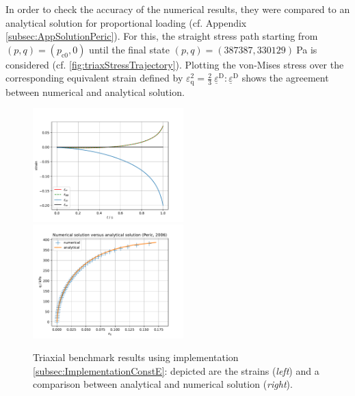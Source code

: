 \documentclass[paper=a4, twoside, pagesize]{scrartcl}
\newcommand{\tensor}[1]{\underline{#1}}
\newcommand{\ppkt}{\colon}
\newcommand{\D}{\text{D}}
\renewcommand{\c}{\text{c}}
\begin{document}
\par
In order to check the accuracy of the numerical results, they were compared to an analytical solution \cite{Peric2006} for proportional loading (cf. Appendix \ref{subsec:AppSolutionPeric}). For this, the straight stress path starting from $(p, q) = (p_{\c0}, 0)$ until the final state $(p, q)=(387387, 330129)\ $Pa is considered (cf. \autoref{fig:triaxStressTrajectory}). Plotting the von-Mises stress over the corresponding equivalent strain defined by $\varepsilon_{\text{q}}^2= {\tfrac{2}{3}\ \tensor\varepsilon^\D\ppkt\tensor\varepsilon^\D}$ shows the agreement between numerical and analytical solution.
\par
\begin{figure}[h!]
  \includegraphics[width=0.52\textwidth]{img/SemiExplicitModifiedCamClay_OpenGeoSys2023/ModCamClay_TriaxStudy_Strains_41.pdf}
  \includegraphics[width=0.52\textwidth]{img/SemiExplicitModifiedCamClay_OpenGeoSys2023/ModCamClay_TriaxStudy_NumVsAnal_41.pdf}
  \caption{Triaxial benchmark results using implementation \ref{subsec:ImplementationConstE}: depicted are the strains (\textsl{left}) and a comparison between analytical and numerical solution (\textsl{right}).}\label{fig:triaxStressStrains}
\end{figure}
\end{document}
